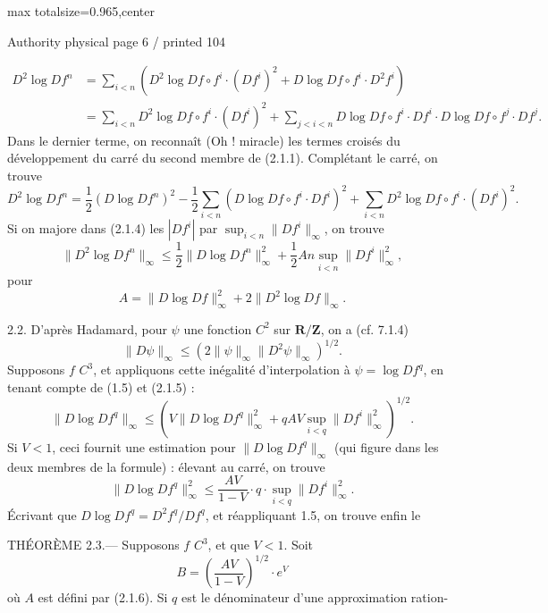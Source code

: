 \documentclass{article}
\begin{document}
\newpage
\noindent\begin{adjustbox}{max totalsize={\textwidth}{0.965\textheight},center}\begin{minipage}{\textwidth}
\noindent\hfill\scriptsize Authority physical page 6 / printed 104\par\normalsize
\[
\tag{2.1.3}
\begin{aligned}
D^2\log Df^n
&=\sum_{i<n}\left(D^2\log Df\circ f^i\cdot(Df^i)^2+D\log Df\circ f^i\cdot D^2f^i\right)\\
&=\sum_{i<n}D^2\log Df\circ f^i\cdot(Df^i)^2
+\sum_{j<i<n}D\log Df\circ f^i\cdot Df^i\cdot D\log Df\circ f^j\cdot Df^j.
\end{aligned}
\]
Dans le dernier terme, on reconnaît (Oh ! miracle) les termes croisés du développement du carré du second membre de (2.1.1). Complétant le carré, on trouve
\[
\tag{2.1.4}
D^2\log Df^n
=\frac12(D\log Df^n)^2
-\frac12\sum_{i<n}(D\log Df\circ f^i\cdot Df^i)^2
+\sum_{i<n}D^2\log Df\circ f^i\cdot(Df^i)^2.
\]
Si on majore dans (2.1.4) les \(|Df^i|\) par \(\sup_{i<n}\|Df^i\|_\infty\), on trouve
\[
\tag{2.1.5}
\|D^2\log Df^n\|_\infty
\leq\frac12\|D\log Df^n\|_\infty^2
+\frac12An\sup_{i<n}\|Df^i\|_\infty^2,
\]
pour
\[
\tag{2.1.6}
A=\|D\log Df\|_\infty^2+2\|D^2\log Df\|_\infty.
\]

2.2. D’après Hadamard, pour \(\psi\) une fonction \(C^2\) sur \(\mathbf R/\mathbf Z\), on a (cf. 7.1.4)
\[
\tag{2.2.1}
\|D\psi\|_\infty\leq\left(2\|\psi\|_\infty\|D^2\psi\|_\infty\right)^{1/2}.
\]
Supposons \(f\) \(C^3\), et appliquons cette inégalité d’interpolation à \(\psi=\log Df^q\), en tenant compte de (1.5) et (2.1.5) :
\[
\tag{2.2.2}
\|D\log Df^q\|_\infty
\leq\left(V\|D\log Df^q\|_\infty^2
+qAV\sup_{i<q}\|Df^i\|_\infty^2\right)^{1/2}.
\]
Si \(V<1\), ceci fournit une estimation pour \(\|D\log Df^q\|_\infty\) (qui figure dans les deux membres de la formule) : élevant au carré, on trouve
\[
\|D\log Df^q\|_\infty^2
\leq\frac{AV}{1-V}\cdot q\cdot\sup_{i<q}\|Df^i\|_\infty^2.
\]
Écrivant que \(D\log Df^q=D^2f^q/Df^q\), et réappliquant 1.5, on trouve enfin le

THÉORÈME 2.3.— Supposons \(f\) \(C^3\), et que \(V<1\). Soit
\[
B=\left(\frac{AV}{1-V}\right)^{1/2}\cdot e^V
\]
où \(A\) est défini par (2.1.6). Si \(q\) est le dénominateur d’une approximation ration-
\end{minipage}\end{adjustbox}
\end{document}
